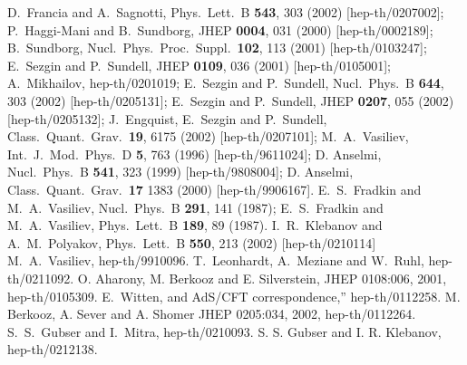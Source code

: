 \documentclass[a4paper,12pt]{article}
\begin{document}
\begin{thebibliography}{9}
D.~Francia and A.~Sagnotti,
Phys.\ Lett.\ B {\bf 543}, 303 (2002)
[hep-th/0207002];
P.~Haggi-Mani and B.~Sundborg,
JHEP {\bf 0004}, 031 (2000)
[hep-th/0002189]; 
B.~Sundborg,
Nucl.\ Phys.\ Proc.\ Suppl.\  {\bf 102}, 113 (2001)
[hep-th/0103247];
E.~Sezgin and P.~Sundell,
JHEP {\bf 0109}, 036 (2001)
[hep-th/0105001];
A.~Mikhailov,
hep-th/0201019;
E.~Sezgin and P.~Sundell,
Nucl.\ Phys.\ B {\bf 644}, 303 (2002) [hep-th/0205131]; E.~Sezgin and
P.~Sundell, JHEP {\bf 0207}, 055 (2002) [hep-th/0205132]; J.~Engquist,
E.~Sezgin and P.~Sundell,
Class.\ Quant.\ Grav.\  {\bf 19}, 6175 (2002)
[hep-th/0207101];
M.~A.~Vasiliev,
Int.\ J.\ Mod.\ Phys.\ D {\bf 5}, 763 (1996) [hep-th/9611024];
D. Anselmi, Nucl.\ Phys.\ B {\bf 541}, 323 (1999) [hep-th/9808004];
D. Anselmi, Class.\ Quant.\ Grav.\ {\bf 17} 1383 (2000)
[hep-th/9906167].
 E.~S.~Fradkin and M.~A.~Vasiliev,
Nucl.\ Phys.\ B {\bf 291}, 141 (1987); E.~S.~Fradkin and
M.~A.~Vasiliev,
Phys.\ Lett.\ B {\bf 189}, 89 (1987).
 I.~R.~Klebanov and A.~M.~Polyakov,
Phys.\ Lett.\ B {\bf 550}, 213 (2002)
[hep-th/0210114]
 M.~A.~Vasiliev,
hep-th/9910096.
 T.~Leonhardt, A.~Meziane and W.~Ruhl, hep-th/0211092. 
 O. Aharony, M. Berkooz and E. Silverstein,
JHEP 0108:006, 2001, hep-th/0105309.
 E.~Witten,
and AdS/CFT correspondence,''
hep-th/0112258.
 M. Berkooz, A. Sever and  A. Shomer 
JHEP 0205:034, 2002, hep-th/0112264.  
 S.~S.~Gubser and I.~Mitra,
hep-th/0210093.
  S. S. Gubser and I. R. Klebanov, hep-th/0212138.

\end{thebibliography}
\end{document}
